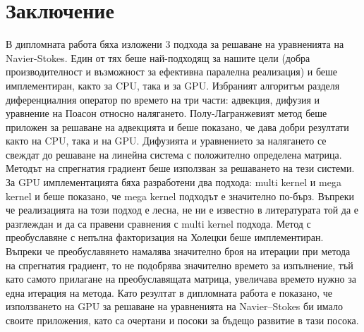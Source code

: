\documentclass[12pt]{report}
\begin{document}
\chapter*{Заключение} 
В дипломната работа бяха изложени 3 подхода за решаване на уравненията на Navier-Stokes. Един от тях беше най-подходящ за нашите цели (добра производителност и възможност за ефективна паралелна реализация) и беше имплементиран, както за CPU, така и за GPU. Избраният алгоритъм разделя диференциалния оператор по времето на три части: адвекция, дифузия и уравнение на Поасон относно налягането. Полу-Лагранжевият метод беше приложен за решаване на адвекцията и беше показано, че дава добри резултати както на CPU, така и на GPU. Дифузията и уравнението за налягането се свеждат до решаване на линейна система с положително определена матрица. Методът на спрегнатия градиент беше използван за решаването на тези системи. За GPU имплементацията бяха разработени два подхода: multi kernel и mega kernel и беше показано, че mega kernel подходът е значително по-бърз. Въпреки че реализацията на този подход е лесна, не ни е известно в литературата той да е разглеждан и да са правени сравнения с multi kernel подхода. Метод с преобуславяне с непълна факторизация на Холецки беше имплементиран. Въпреки че преобуславянето намалява значително броя на итерации при метода на спрегнатия градиент, то не подобрява значително времето за изпълнение, тъй като самото прилагане на преобуславящата матрица, увеличава времето нужно за една итерация на метода. Като резултат в дипломната работа е показано, че използването на GPU за решаване на уравненията на Navier--Stokes би имало своите приложения, като са очертани и посоки за бъдещо развитие в тази посока.

\printbibliography
\end{document}
